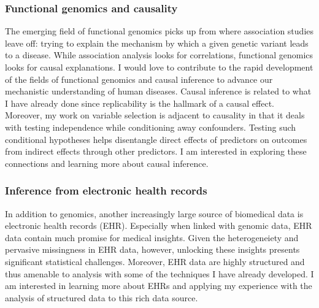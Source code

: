 \documentclass[11pt]{article}
\begin{document}
%
%

\subsubsection*{Functional genomics and causality}

The emerging field of functional genomics picks up from where association studies leave off: trying to explain the mechanism by which a given genetic variant leads to a disease. While association analysis looks for correlations, functional genomics looks for causal explanations. I would love to contribute to the rapid development of the fields of functional genomics and causal inference to advance our mechanistic understanding of human diseases. Causal inference is related to what I have already done since replicability is the hallmark of a causal effect. Moreover, my work on variable selection is adjacent to causality in that it deals with testing independence while conditioning away confounders. Testing such conditional hypotheses helps disentangle direct effects of predictors on outcomes from indirect effects through other predictors. I am interested in exploring these connections and learning more about causal inference.

\subsubsection*{Inference from electronic health records}

In addition to genomics, another increasingly large source of biomedical data is electronic health records (EHR). Especially when linked with genomic data, EHR data contain much promise for medical insights. Given the heterogeneiety and pervasive missingness in EHR data, however, unlocking these insights presents significant statistical challenges. Moreover, EHR data are highly structured and thus amenable to analysis with some of the techniques I have already developed. I am interested in learning more about EHRs and applying my experience with the analysis of structured data to this rich data source.
\end{document}

